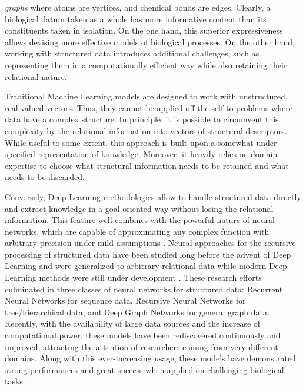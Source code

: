 \emph{graphs} where atoms are vertices, and chemical bonds are edges. Clearly, a biological datum taken as a whole has more informative content than its constituents taken in isolation. On the one hand, this superior expressiveness allows devising more effective models of biological processes. On the other hand, working with structured data introduces additional challenges, such as representing them in a computationally efficient way while also retaining their relational nature.

Traditional Machine Learning models are designed to work with unstructured, real-valued vectors. Thus, they cannot be applied off-the-self to problems where data have a complex structure. In principle, it is possible to circumvent this complexity by  the relational information into vectors of structural descriptors. While useful to some extent, this approach is built upon a somewhat under-specified representation of knowledge. Moreover, it heavily relies on domain expertise to choose what structural information needs to be retained and what needs to be discarded.

Conversely, Deep Learning methodologies allow to handle structured data directly and extract knowledge in a goal-oriented way without losing the relational information. This feature well combines with the powerful nature of neural networks, which are capable of approximating any complex function with arbitrary precision under mild assumptions  \citep{cybenko1998approximationuniversal,hammer2005universal}. Neural approaches for the recursive processing of structured data have been studied long before the advent of Deep Learning \cite{elman1990rnn,sperduti1997generalizedneuron,frasconi1998general} and were generalized to arbitrary relational data while modern Deep Learning methods were still under development \citep{micheli2009nn4g,scarselli2009gnn}. These research efforts culminated in three classes of neural networks for structured data: Recurrent Neural Networks for sequence data, Recursive Neural Networks for tree/hierarchical data, and Deep Graph Networks for general graph data. Recently, with the availability of large data sources and the increase of computational power, these models have been rediscovered continuously and improved, attracting the attention of researchers coming from very different domains. Along with this ever-increasing usage, these models have demonstrated strong performances and great success when applied on challenging biological tasks.
\cite{bianucci2000applicationcascorstructurechemistry,baldi2013recursiveneuralnets,duvenaud2015molecularfingerprint,bradshaw2019moleculechef}.


